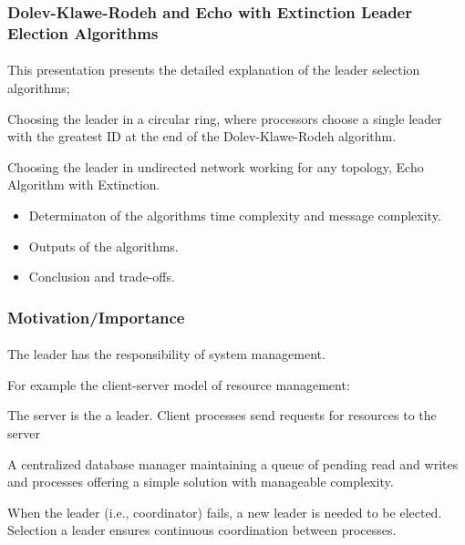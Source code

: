 \documentclass[11pt]{beamer}              %
\begin{document}
\begin{frame}
\frametitle{Dolev-Klawe-Rodeh and Echo with Extinction Leader Election Algorithms}
\framesubtitle{}
This presentation presents the detailed explanation of the leader selection algorithms;
\item Choosing the leader in a circular ring, where processors choose a single leader with the greatest ID at the end of the Dolev-Klawe-Rodeh algorithm.
\item Choosing the leader in undirected network working for any topology, Echo Algorithm with Extinction.
\begin{itemize}
\item Determinaton of the algorithms time complexity and message complexity.
\item Outputs of the algorithms.
\item Conclusion and trade-offs.
\end{itemize}

\end{frame}



\begin{frame}
\frametitle{Motivation/Importance}
\framesubtitle{}
\item The leader has the responsibility of system management. 
\item For example the client-server model of resource management: 
\item The server is the a leader. Client processes send requests for resources to the server
\item A centralized database manager maintaining a queue of pending read and writes and processes offering a simple solution with manageable complexity.
\item When the leader (i.e., coordinator) fails, a new leader is needed to be elected. Selection a leader ensures continuous coordination between processes.
\end{frame}



\end{document}

